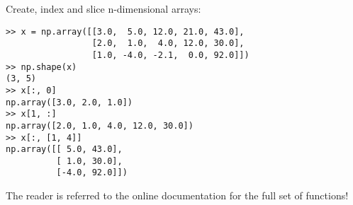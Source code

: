 Create, index and slice n-dimensional arrays:

\begin{lstlisting}[frame=single]
>> x = np.array([[3.0,  5.0, 12.0, 21.0, 43.0],
                 [2.0,  1.0,  4.0, 12.0, 30.0],
                 [1.0, -4.0, -2.1,  0.0, 92.0]])
>> np.shape(x)
(3, 5)
>> x[:, 0]
np.array([3.0, 2.0, 1.0])
>> x[1, :]
np.array([2.0, 1.0, 4.0, 12.0, 30.0])
>> x[:, [1, 4]]
np.array([[ 5.0, 43.0],
          [ 1.0, 30.0],
          [-4.0, 92.0]])
\end{lstlisting}

The reader is referred to the online documentation for the full set of functions!


